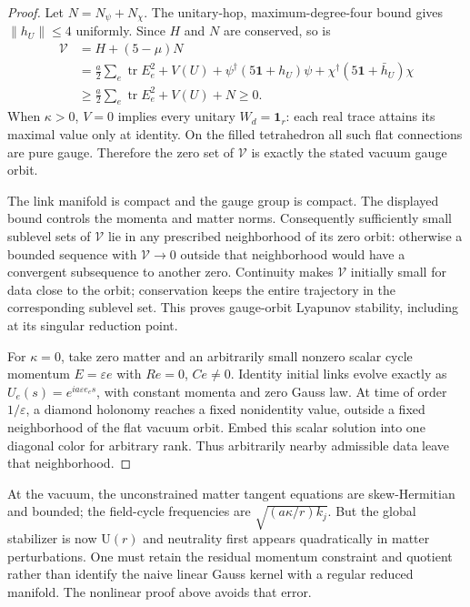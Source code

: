 \documentclass[11pt,a4paper]{article}
\newcommand{\tr}{\operatorname{tr}}\newcommand{\Rea}{\operatorname{Re}}\newcommand{\U}{\mathrm U}
\newcommand{\id}{\mathbf1}\newcommand{\dd}{\mathrm d}\newcommand{\diag}{\operatorname{diag}}
\begin{document}
\begin{proof}
Let $N=N_\psi+N_\chi$. The unitary-hop, maximum-degree-four bound gives $\|h_U\|\leq4$ uniformly. Since $H$ and $N$ are conserved, so is
\begin{align*}
\mathcal V&=H+(5-\mu)N\\
&=\frac a2\sum_e\tr E_e^2+V(U)
+\psi^\dagger(5\id+h_U)\psi
+\chi^\dagger(5\id+\bar h_U)\chi\\
&\geq\frac a2\sum_e\tr E_e^2+V(U)+N\geq0.
\end{align*}
When $\kappa>0$, $V=0$ implies every unitary $W_d=\id_r$: each real trace attains its maximal value only at identity. On the filled tetrahedron all such flat connections are pure gauge. Therefore the zero set of $\mathcal V$ is exactly the stated vacuum gauge orbit.

The link manifold is compact and the gauge group is compact. The displayed bound controls the momenta and matter norms. Consequently sufficiently small sublevel sets of $\mathcal V$ lie in any prescribed neighborhood of its zero orbit: otherwise a bounded sequence with $\mathcal V\to0$ outside that neighborhood would have a convergent subsequence to another zero. Continuity makes $\mathcal V$ initially small for data close to the orbit; conservation keeps the entire trajectory in the corresponding sublevel set. This proves gauge-orbit Lyapunov stability, including at its singular reduction point.

For $\kappa=0$, take zero matter and an arbitrarily small nonzero scalar cycle momentum $E=\varepsilon e$ with $Re=0$, $Ce\ne0$. Identity initial links evolve exactly as $U_e(s)=e^{ia\varepsilon e_es}$, with constant momenta and zero Gauss law. At time of order $1/\varepsilon$, a diamond holonomy reaches a fixed nonidentity value, outside a fixed neighborhood of the flat vacuum orbit. Embed this scalar solution into one diagonal color for arbitrary rank. Thus arbitrarily nearby admissible data leave that neighborhood.
\end{proof}

At the vacuum, the unconstrained matter tangent equations are skew-Hermitian and bounded; the field-cycle frequencies are $\sqrt{(a\kappa/r)k_j}$. But the global stabilizer is now $\U(r)$ and neutrality first appears quadratically in matter perturbations. One must retain the residual momentum constraint and quotient rather than identify the naive linear Gauss kernel with a regular reduced manifold. The nonlinear proof above avoids that error.

\newpage
\end{document}
